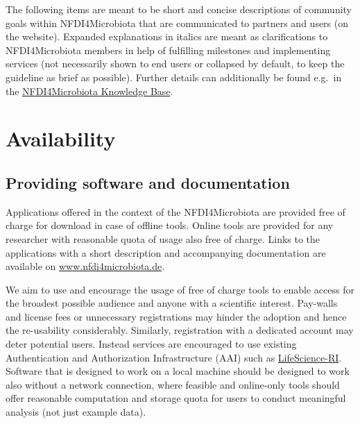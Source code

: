 \documentclass[
  paper=a4,
  ,captions=tableheading
]{scrartcl}
\renewenvironment{quote}{\begin{shaded*}\begin{em}}{\end{em}\end{shaded*}}
\renewenvironment{quote}{\begin{customblockquote}\list{}{\rightmargin=0em\leftmargin=0em}%
\item\relax\color{blockquote-text}\ignorespaces}{\unskip\unskip\endlist\end{customblockquote}}
\begin{document}
\begin{quote}
The following items are meant to be short and concise descriptions of
community goals within NFDI4Microbiota that are communicated to partners
and users (on the website). Expanded explanations in italics are meant
as clarifications to NFDI4Microbiota members in help of fulfilling
milestones and implementing services (not necessarily shown to end users
or collapsed by default, to keep the guideline as brief as possible).
Further details can additionally be found e.g.~in the
\href{https://nfdi4microbiota.github.io/nfdi4microbiota-knowledge-base/}{NFDI4Microbiota
Knowledge Base}.
\end{quote}

\hypertarget{availability}{%
\section{Availability}\label{availability}}

\hypertarget{providing-software-and-documentation}{%
\subsection{Providing software and
documentation}\label{providing-software-and-documentation}}

Applications offered in the context of the NFDI4Microbiota are provided
free of charge for download in case of offline tools. Online tools are
provided for any researcher with reasonable quota of usage also free of
charge. Links to the applications with a short description and
accompanying documentation are available on
\url{www.nfdi4microbiota.de}.

\begin{quote}
We aim to use and encourage the usage of free of charge tools to enable
access for the broadest possible audience and anyone with a scientific
interest. Pay-walls and license fees or unnecessary registrations may
hinder the adoption and hence the re-usability considerably. Similarly,
registration with a dedicated account may deter potential users. Instead
services are encouraged to use existing Authentication and Authorization
Infrastructure (AAI) such as
\href{https://lifescience-ri.eu/ls-login.html}{LifeScience-RI}. Software
that is designed to work on a local machine should be designed to work
also without a network connection, where feasible and online-only tools
should offer reasonable computation and storage quota for users to
conduct meaningful analysis (not just example data).
\end{quote}
\end{document}

